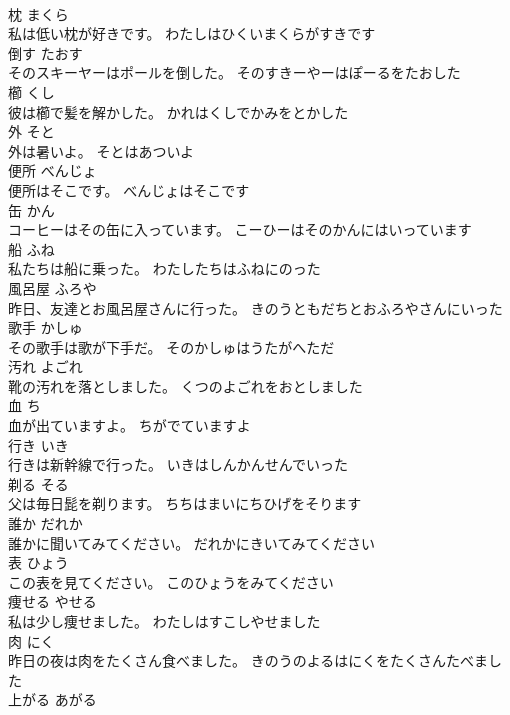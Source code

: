 \documentclass[8pt]{extreport}
\begin{document}
\begin{CJK}{UTF8}{min}
\\	枕	まくら	
\\	私は低い枕が好きです。	わたしはひくいまくらがすきです	
\\	倒す	たおす	
\\	そのスキーヤーはポールを倒した。	そのすきーやーはぽーるをたおした	
\\	櫛	くし	
\\	彼は櫛で髪を解かした。	かれはくしでかみをとかした	
\\	外	そと	
\\	外は暑いよ。	そとはあついよ	
\\	便所	べんじょ	
\\	便所はそこです。	べんじょはそこです	
\\	缶	かん	
\\	コーヒーはその缶に入っています。	こーひーはそのかんにはいっています	
\\	船	ふね	
\\	私たちは船に乗った。	わたしたちはふねにのった	
\\	風呂屋	ふろや	
\\	昨日、友達とお風呂屋さんに行った。	きのうともだちとおふろやさんにいった	
\\	歌手	かしゅ	
\\	その歌手は歌が下手だ。	そのかしゅはうたがへただ	
\\	汚れ	よごれ	
\\	靴の汚れを落としました。	くつのよごれをおとしました	
\\	血	ち	
\\	血が出ていますよ。	ちがでていますよ	
\\	行き	いき	
\\	行きは新幹線で行った。	いきはしんかんせんでいった	
\\	剃る	そる	
\\	父は毎日髭を剃ります。	ちちはまいにちひげをそります	
\\	誰か	だれか	
\\	誰かに聞いてみてください。	だれかにきいてみてください	
\\	表	ひょう	
\\	この表を見てください。	このひょうをみてください	
\\	痩せる	やせる	
\\	私は少し痩せました。	わたしはすこしやせました	
\\	肉	にく	
\\	昨日の夜は肉をたくさん食べました。	きのうのよるはにくをたくさんたべました	
\\	上がる	あがる	

\end{CJK}
\end{document}
